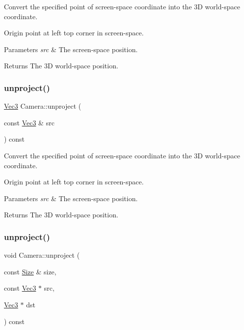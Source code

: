 Convert the specified point of screen-\/space coordinate into the 3D world-\/space coordinate.

Origin point at left top corner in screen-\/space. 
\begin{DoxyParams}{Parameters}
{\em src} & The screen-\/space position. \\
\hline
\end{DoxyParams}
\begin{DoxyReturn}{Returns}
The 3D world-\/space position. 
\end{DoxyReturn}
\mbox{\label{classCamera_a06eccde5c9fc644d94e69e505a78d048}} 
\subsubsection{\texorpdfstring{unproject()}{unproject()}\hspace{0.1cm}{\footnotesize\ttfamily [2/4]}}
{\footnotesize\ttfamily \hyperlink{classVec3}{Vec3} Camera\+::unproject (\begin{DoxyParamCaption}\item[{const \hyperlink{classVec3}{Vec3} \&}]{src }\end{DoxyParamCaption}) const}

Convert the specified point of screen-\/space coordinate into the 3D world-\/space coordinate.

Origin point at left top corner in screen-\/space. 
\begin{DoxyParams}{Parameters}
{\em src} & The screen-\/space position. \\
\hline
\end{DoxyParams}
\begin{DoxyReturn}{Returns}
The 3D world-\/space position. 
\end{DoxyReturn}
\mbox{\label{classCamera_a48a0dab2e51ef11a166e650224e23419}} 
\subsubsection{\texorpdfstring{unproject()}{unproject()}\hspace{0.1cm}{\footnotesize\ttfamily [3/4]}}
{\footnotesize\ttfamily void Camera\+::unproject (\begin{DoxyParamCaption}\item[{const \hyperlink{classSize}{Size} \&}]{size,  }\item[{const \hyperlink{classVec3}{Vec3} $\ast$}]{src,  }\item[{\hyperlink{classVec3}{Vec3} $\ast$}]{dst }\end{DoxyParamCaption}) const}

